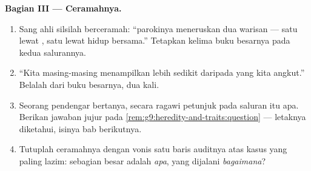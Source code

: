 \begin{problem}
\medskip\noindent\textbf{Bagian III --- Ceramahnya.}
\begin{enumerate}[resume]
  \item Sang ahli silsilah berceramah: ``parokinya
        meneruskan dua warisan --- satu lewat , satu
        lewat hidup bersama.'' Tetapkan kelima  buku
        besarnya pada kedua salurannya.
  \item ``Kita masing-masing menampilkan lebih sedikit
        daripada yang kita angkut.'' Belalah dari buku
        besarnya, dua kali.
  \item Seorang pendengar bertanya, secara ragawi petunjuk
        pada saluran  itu apa. Berikan jawaban jujur
        pada \cref{rem:g9:heredity-and-traits:question}
        --- letaknya diketahui, isinya bab berikutnya.
  \item Tutuplah ceramahnya dengan vonis satu baris auditnya
        atas kasus yang paling lazim: sebagian besar 
        adalah \emph{apa}, yang dijalani \emph{bagaimana}?
\end{enumerate}
\end{problem}
